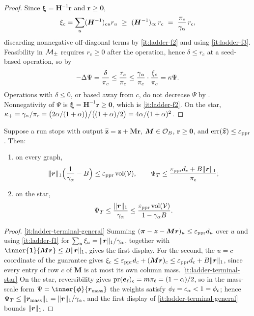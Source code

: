 \begin{proof}
Since $\bm{\xi}=\bm{H}^{-1}\bm{r}$ and $\bm{r}\ge\bm{0}$,
\[
    \xi_{c}=\sum_{u}(\bm{H}^{-1})_{cu}r_{u}
    \ \ge\ (\bm{H}^{-1})_{cc}\,r_{c}
    \ =\ \frac{\pi_{c}}{\gamma_{\alpha}}\,r_{c},
\]
discarding nonnegative off-diagonal terms by \ref{it:ladder-f2} and using
\ref{it:ladder-f3}. Feasibility in $\mathcal{M}_{\pm}$ requires $r_{c}\ge0$ after the
operation, hence $\delta\le r_{c}$ at a seed-based operation, so by
\[
    -\Delta\Psi=\frac{\delta}{\pi_{c}}\le\frac{r_{c}}{\pi_{c}}
    \le\frac{\gamma_{\alpha}}{\pi_{c}}\cdot\frac{\xi_{c}}{\pi_{c}}=\kappa\Psi .
\]
Operations with $\delta\le0$, or based away from $c$, do not decrease $\Psi$
by . Nonnegativity of $\Psi$ is
$\bm{\xi}=\bm{H}^{-1}\bm{r}\ge\bm{0}$, which is
\ref{it:ladder-f2}. On the star,
$\kappa_{+}=\gamma_{\alpha}/\pi_{c}=\bigl(2\alpha/(1+\alpha)\bigr)\big/
\bigl((1+\alpha)/2\bigr)=4\alpha/(1+\alpha)^{2}$.
\end{proof}

\begin{lemma}
\label{lem:ladder-terminal}
Suppose a run stops with output
$\widehat{\bm{z}}=\bm{z}+\bm{M}\bm{r}$,
$\bm{M}\in\mathcal{O}_{B}$, $\bm{r}\ge\bm{0}$, and
$\operatorname{err}(\widehat{\bm{z}})\le\varepsilon_{\mathrm{ppr}}$. Then:
\begin{enumerate}[label=\textup{(\roman*)},leftmargin=3em]
    \item\label{it:ladder-terminal-general} on every graph,
        \[
            \lVert\bm{r}\rVert_{1}\Bigl(\frac{1}{\gamma_{\alpha}}-B\Bigr)
            \le\varepsilon_{\mathrm{ppr}}\operatorname{vol}(\mathcal V),
            \qquad
            \Psi_{T}\le
            \frac{\varepsilon_{\mathrm{ppr}} d_{c}+B\lVert\bm{r}\rVert_{1}}{\pi_{c}};
        \]
    \item\label{it:ladder-terminal-star} on the star,
        \[
            \Psi_{T}\le\frac{\lVert\bm{r}\rVert_{1}}{\gamma_{\alpha}}
            \le\frac{\varepsilon_{\mathrm{ppr}}\operatorname{vol}(\mathcal V)}{1-\gamma_{\alpha} B}.
        \]
\end{enumerate}
\end{lemma}

\begin{proof}
\ref{it:ladder-terminal-general} Summing
$(\bm{\pi}-\bm{z}-\bm{M}\bm{r})_{u}\le\varepsilon_{\mathrm{ppr}} d_{u}$ over $u$ and using
\ref{it:ladder-f1} for
$\sum_{u}\xi_{u}=\lVert\bm{r}\rVert_{1}/\gamma_{\alpha}$, together with
$\inner{\one}{\bm{M}\bm{r}}\le B\norm{\bm{r}}_{1}$, gives the first display.
For the second, the $u=c$ coordinate of the guarantee gives
$\xi_{c}\le\varepsilon_{\mathrm{ppr}} d_{c}+(\bm{M}\bm{r})_{c}
\le\varepsilon_{\mathrm{ppr}} d_{c}+B\lVert\bm{r}\rVert_{1}$, since every entry of row $c$ of
$\bm{M}$ is at most its own column mass.
\ref{it:ladder-terminal-star} On the star, reversibility gives
$\operatorname{pr}(\bm{e}_{\ell})_{c}=m\pi_{\ell}=(1-\alpha)/2$, so in the mass-scale form
$\Psi=\inner{\bm{\phi}}{\bm{r}_{\mathrm{mass}}}$ the weights satisfy
$\phi_{\ell}=c_{\alpha}<1=\phi_{c}$; hence
$\Psi_{T}\le\lVert\bm{r}_{\mathrm{mass}}\rVert_{1}
=\lVert\bm{r}\rVert_{1}/\gamma_{\alpha}$, and the first display of
\ref{it:ladder-terminal-general} bounds $\lVert\bm{r}\rVert_{1}$.
\end{proof}

